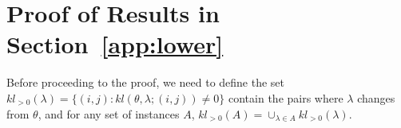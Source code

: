 \documentclass{article}
\begin{document}






\section{Proof of Results in Section~\ref{app:lower}}\label{sec:proof_lower_bound}
Before proceeding to the proof, we need to define the set $kl_{>0}(\lambda) = \{(i,j): kl(\theta, \lambda; (i,j)) \neq 0\}$ contain the pairs where $\lambda$ changes from $\theta$, and for any set of instances $A$, $kl_{>0}(A) = \cup_{\lambda \in A} kl_{>0}(\lambda)$.
\end{document}
